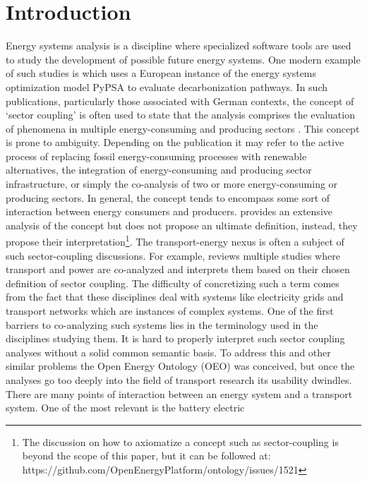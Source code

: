 ﻿\section{Introduction}
\label{introduction}
Energy systems analysis is a discipline where specialized software tools are
used to study the development of possible future energy systems. One modern
example of such studies is \cite{Victoria.2022} which uses a European instance
of the energy systems optimization model PyPSA \cite{Brown.2018} to evaluate
decarbonization pathways. In such publications, particularly those associated
with German contexts, the concept of `sector coupling' is often used to state
that the analysis comprises the evaluation of phenomena in multiple
energy-consuming and producing sectors \cite{Fridgen.2020}. This concept is
prone to ambiguity. Depending on the publication it may refer to the active
process of replacing fossil energy-consuming processes with renewable
alternatives, the integration of energy-consuming and producing sector
infrastructure, or simply the co-analysis of two or more energy-consuming or
producing sectors. In general, the concept tends to encompass some sort of
interaction between energy consumers and producers. \cite{Ramsebner.2021}
provides an extensive analysis of the concept but does not propose an ultimate
definition, instead, they propose their interpretation\footnote{The discussion
on how to axiomatize a concept such as sector-coupling is beyond the scope of
this paper, but it can be followed at:
https://github.com/OpenEnergyPlatform/ontology/issues/1521}. The
transport-energy nexus is often a subject of such sector-coupling discussions.
For example, \cite{Robinius.2017} reviews multiple studies where transport and
power are co-analyzed and interprets them based on their chosen definition of
sector coupling. The difficulty of concretizing such a term comes from the fact
that these disciplines deal with systems like electricity grids and transport
networks which are instances of complex systems. One of the first barriers to
co-analyzing such systems lies in the terminology used in the disciplines
studying them. It is hard to properly interpret such sector coupling analyses
without a solid common semantic basis. To address this and other similar
problems the Open Energy Ontology (OEO) \cite{Booshehri.2021} was conceived, but
once the analyses go too deeply into the field of transport research its
usability dwindles. There are many points of interaction between an energy
system and a transport system. One of the most relevant is the battery electric
